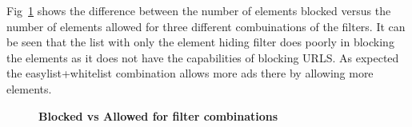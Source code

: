 Fig~\ref{fig:block-allow} shows the difference between the number of  elements  blocked  versus the number of elements allowed for three different  combuinations of the filters.
It can be seen that the list with only the element hiding filter does poorly in blocking the  elements as it does not have the capabilities of blocking URLS.
As expected the easylist+whitelist combination allows more ads there by allowing more elements.
\begin{figure}
	\centering
	\vspace*{-0.5cm}
	\caption{\textbf{Blocked vs Allowed for filter combinations}}
	\label{fig:block-allow}
	\vspace*{-0.5cm}
\end{figure}